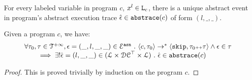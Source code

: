   For every labeled variable in program $c$, $x^l \in \mathtt{L}_c$, there is a unique abstract event in program's abstract execution trace $\hat{\mathtt{\epsilon}{}} \in \mathtt{abs}{\mathtt{trace}}(c)$ of form $(l, \_, \_)$. 
  \begin{lem}
  Given a program ${c}$, we have:
  \[
  \begin{array}{l}
   \forall \mathtt{\tau}_0, \mathtt{\tau} \in \mathcal{T}^{+\infty} ,  \mathtt{\epsilon} = (\_, l, \_, \_) \in \mathcal{E}^{\mathtt{{asn}}} ~.~
  \langle {c}, \mathtt{\tau}_0 \rangle \to^{*} \langle \mathtt{skip}, \mathtt{\tau}_0 {\scriptscriptstyle ++} \mathtt{\tau} \rangle 
  \land \mathtt{\epsilon} \in \mathtt{\tau} 
  \\
  \qquad \implies \exists! \hat{\mathtt{\epsilon}{}} = (l, \_, \_) \in (\mathcal{L}\times \mathcal{DC}^{\top} \times \mathcal{L}) ~.~ 
  \hat{\mathtt{\epsilon}{}} \in \mathtt{abs}{\mathtt{trace}}(c)
  \end{array}
  \]
  \end{lem}
  \begin{proof}
    This is proved trivially by induction on the program $c$.
  \end{proof}